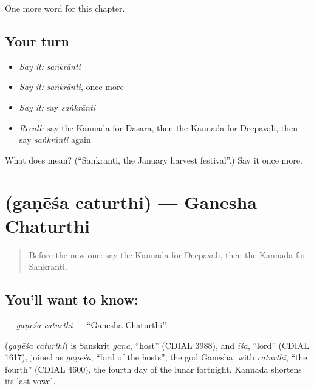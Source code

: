 \begin{grammarlens}[title={What you've built}]
One more word for this chapter.
\end{grammarlens}

\subsection*{Your turn}
\begin{itemize}
\raggedright
  \item \emph{Say it:} \emph{saṅkrānti}
  \item \emph{Say it:} \emph{saṅkrānti}, once more
  \item \emph{Say it:} say \emph{saṅkrānti}
  \item \emph{Recall:} say the Kannada for Dasara, then the Kannada for Deepavali, then say \emph{saṅkrānti} again
\end{itemize}

\begin{tcolorbox}[breakable,colback=teal!4,colframe=teal!35!black,title={Before you move on}]
What does  mean? (\textquotedblleft{}Sankranti, the January harvest festival\textquotedblright{}.) Say it once more.
\end{tcolorbox}
\section[\texorpdfstring{\kn{ಗಣೇಶ} \kn{ಚತುರ್ಥಿ} (gaṇēśa caturthi)}{ಗಣೇಶ ಚತುರ್ಥಿ (gaṇēśa caturthi)}]{  (gaṇēśa caturthi) — Ganesha Chaturthi}

\label{lesson:KA-C247-ganesa-caturthi}



\begin{quote}
Before the new one: say the Kannada for Deepavali, then the Kannada for Sankranti.
\end{quote}

\subsection*{You'll want to know:  }
\textbf{ } — \emph{gaṇēśa caturthi} — \textquotedblleft{}Ganesha Chaturthi\textquotedblright{}.

\begin{cousinweb}
\textbf{ } (\emph{gaṇēśa caturthi}) is Sanskrit \emph{gaṇa}, \textquotedblleft{}host\textquotedblright{} (CDIAL 3988), and \emph{īśa}, \textquotedblleft{}lord\textquotedblright{} (CDIAL 1617), joined as \emph{gaṇeśa}, \textquotedblleft{}lord of the hosts\textquotedblright{}, the god Ganesha, with \emph{caturthī}, \textquotedblleft{}the fourth\textquotedblright{} (CDIAL 4600), the fourth day of the lunar fortnight. Kannada shortens its last vowel.
\end{cousinweb}

